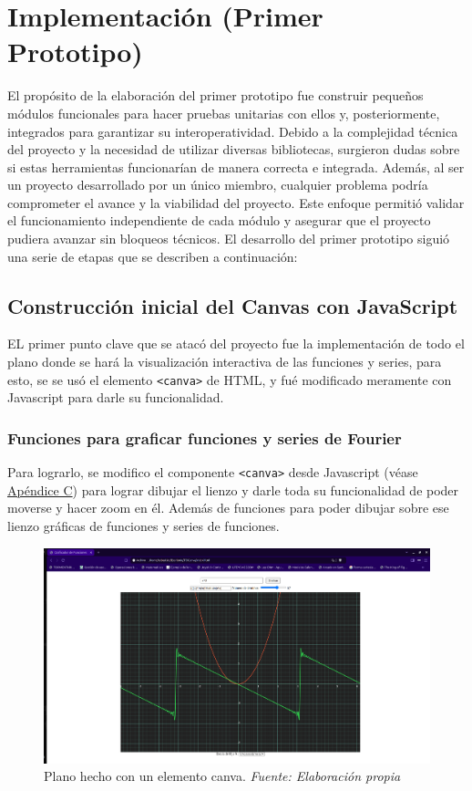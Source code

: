 \chapter{Implementación \newline (Primer Prototipo)}\label{ch:Implementación}
El propósito de la elaboración del primer prototipo fue construir pequeños módulos funcionales para hacer pruebas unitarias con ellos y, posteriormente, integrados para garantizar su interoperatividad. Debido a la complejidad técnica del proyecto y la necesidad de utilizar diversas bibliotecas, surgieron dudas sobre si estas herramientas funcionarían de manera correcta e integrada. Además, al ser un proyecto desarrollado por un único miembro, cualquier problema podría comprometer el avance y la viabilidad del proyecto. Este enfoque permitió validar el funcionamiento independiente de cada módulo y asegurar que el proyecto pudiera avanzar sin bloqueos técnicos.
El desarrollo del primer prototipo siguió una serie de etapas que se describen a continuación:

\section{Construcción inicial del Canvas con JavaScript}
EL primer punto clave que se atacó del proyecto fue la implementación de todo el plano donde se hará la visualización interactiva de las funciones y series, para esto, se se usó el elemento \texttt{<canva>} de HTML, y fué modificado meramente con Javascript para darle su funcionalidad.

\subsection{Funciones para graficar funciones y series de Fourier}
Para lograrlo, se modifico el componente \texttt{<canva>} desde Javascript (véase \hyperref[app3:canva_js]{Apéndice C}) para lograr dibujar el lienzo y darle toda su funcionalidad de poder moverse y hacer zoom en él. Además de funciones para poder dibujar sobre ese lienzo gráficas de funciones y series de funciones.
\begin{figure}[H]
	\centering
	\includegraphics[width=1\textwidth]{img/chapter06/prueba_grafica.png}
	\caption[Plano hecho con un elemento canva.]{Plano hecho con un elemento canva. \textit{Fuente: Elaboración propia}}
	\label{fig:prueba_grafica}
\end{figure}

